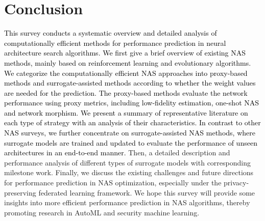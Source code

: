 \documentclass[journal]{IEEEtran}
\begin{document}




\section{Conclusion}

\textcolor{black}{This survey conducts a systematic overview and detailed analysis of computationally efficient methods for performance prediction in neural architecture search algorithms. We first give a brief overview of existing NAS methods, mainly based on reinforcement learning and evolutionary algorithms. We categorize the computationally efficient NAS approaches into proxy-based methods and surrogate-assisted methods according to whether the weight values are needed for the prediction. The proxy-based methods evaluate the network performance using proxy metrics, including low-fidelity estimation, one-shot NAS and network morphism. We present a summary of representative literature on each type of strategy with an analysis of their characteristics. In contrast to other NAS surveys, we further concentrate on surrogate-assisted NAS methods, where surrogate models are trained and updated to evaluate the performance of unseen architectures in an end-to-end manner.} Then, a detailed  description and performance analysis of different types of surrogate models with corresponding milestone work. Finally, we discuss the existing challenges and future directions for performance prediction in NAS optimization, especially under the privacy-preserving federated learning framework. We hope this survey will provide some insights into more efficient performance prediction in NAS algorithms, thereby promoting research in AutoML and security machine learning.


\end{document}
